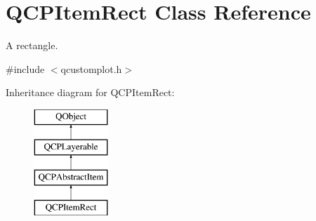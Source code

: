 \hypertarget{class_q_c_p_item_rect}{}\section{Q\+C\+P\+Item\+Rect Class Reference}
\label{class_q_c_p_item_rect}


A rectangle.  




{\ttfamily \#include $<$qcustomplot.\+h$>$}

Inheritance diagram for Q\+C\+P\+Item\+Rect\+:\begin{figure}[H]
\begin{center}
\leavevmode
\includegraphics[height=4.000000cm]{class_q_c_p_item_rect}
\end{center}
\end{figure}
